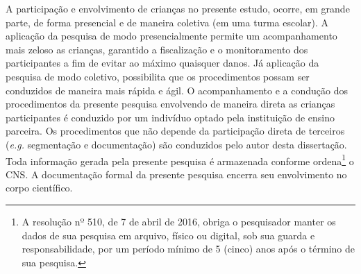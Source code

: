 A participação e envolvimento de crianças no presente estudo, ocorre, em grande parte, de forma presencial e de maneira coletiva (em uma turma escolar). A aplicação da pesquisa de modo presencialmente permite um acompanhamento mais zeloso as crianças, garantido a fiscalização e o monitoramento dos participantes a fim de evitar ao máximo quaisquer danos. Já aplicação da pesquisa de modo coletivo, possibilita que os procedimentos possam ser conduzidos de maneira mais rápida e ágil. O acompanhamento e a condução dos procedimentos da presente pesquisa envolvendo de maneira direta as crianças participantes é conduzido por um indivíduo optado pela instituição de ensino parceira. Os procedimentos que não depende da participação direta de terceiros (\textit{e.g.} segmentação e documentação) são conduzidos pelo autor desta dissertação. Toda informação gerada pela presente pesquisa é armazenada conforme ordena\footnote{A resolução nº 510, de 7 de abril de 2016, obriga o pesquisador manter os dados de sua pesquisa em arquivo, físico ou digital, sob sua guarda e responsabilidade, por um período mínimo de 5 (cinco) anos após o término de sua pesquisa.} o \ac{CNS}. A documentação formal da presente pesquisa encerra seu envolvimento no corpo científico.






